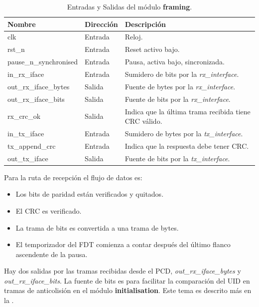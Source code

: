 \documentclass[a4paper, twoside, 11pt]{report}
\begin{document}
\begin{table}[htb]
  \centering
  \tablezebra
  \begin{tabulary}{\linewidth}{l|l|L}
    \textbf{Nombre}&\textbf{Dirección}&\textbf{Descripción} \\
    \hline
    clk&Entrada&Reloj. \\
    rst\_n&Entrada&Reset activo bajo. \\
    pause\_n\_synchronised&Entrada&Pausa, activa bajo, sincronizada. \\
    in\_rx\_iface&Entrada&Sumidero de bits por la \textit{rx\_interface}. \\
    out\_rx\_iface\_bytes&Salida&Fuente de bytes por la \textit{rx\_interface}. \\
    out\_rx\_iface\_bits&Salida&Fuente de bits por la \textit{rx\_interface}. \\
    rx\_crc\_ok&Salida&Indica que la última trama recibida tiene CRC válido. \\
    in\_tx\_iface&Entrada&Sumidero de bytes por la \textit{tx\_interface}. \\
    tx\_append\_crc&Entrada&Indica que la respuesta debe tener CRC. \\
    out\_tx\_iface&Salida&Fuente de bits por la \textit{tx\_interface}. \\
  \end{tabulary}
  \caption{Entradas y Salidas del módulo \textbf{framing}.}
  \label{tab:ports_framing}
\end{table}

\FloatBarrier

Para la ruta de recepción el flujo de datos es:

\begin{itemize}
  \item Los bits de paridad están verificados y quitados.
  \item El CRC es verificado.
  \item La trama de bits es convertida a una trama de bytes.
  \item El temporizador del FDT comienza a contar después del último flanco ascendente de la pausa.
\end{itemize}

Hay dos salidas por las tramas recibidas desde el PCD, \textit{out\_rx\_iface\_bytes} y \textit{out\_rx\_iface\_bits}. La fuente de bits es para facilitar la comparación del UID en tramas de anticolisión en el módulo \textbf{initialisation}. Este tema es descrito más en la .
\end{document}
